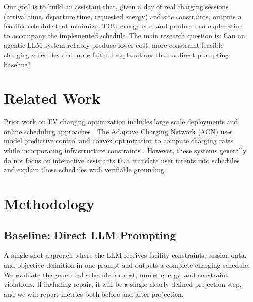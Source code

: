 \documentclass{article}
\begin{document}
Our goal is to build an assistant that, given a day of real charging sessions (arrival time, departure time, requested energy) and site constraints, outputs a feasible schedule that minimizes TOU energy cost and produces an explanation to accompany the implemented schedule. The main research question is: Can an agentic LLM system reliably produce lower cost, more constraint-feasible charging schedules and more faithful explanations than a direct prompting baseline?

\section{Related Work}
Prior work on EV charging optimization includes large scale deployments and online scheduling approaches \cite{wang2016survey,mukherjee2015review}. The Adaptive Charging Network (ACN) uses model predictive control and convex optimization to compute charging rates while incorporating infrastructure constraints \cite{lee2020acn}. However, these systems generally do not focus on interactive assistants that translate user intents into schedules and explain those schedules with verifiable grounding.

\section{Methodology}
\subsection{Baseline: Direct LLM Prompting}
A single shot approach where the LLM receives facility constraints, session data, and objective definition in one prompt and outputs a complete charging schedule. We evaluate the generated schedule for cost, unmet energy, and constraint violations. If including repair, it will be a single clearly defined projection step, and we will report metrics both before and after projection.
\end{document}
